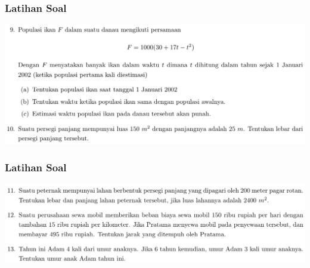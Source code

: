 \documentclass[pdflatex,compress,mathserif]{beamer}
\begin{document}
\begin{frame}
	\frametitle{Latihan Soal}
	\begin{center}
		\includegraphics[width=\linewidth]{img/img36}
	\end{center}
\end{frame}

\begin{frame}
	\frametitle{Latihan Soal}
	\begin{center}
		\includegraphics[width=\linewidth]{img/img37}
	\end{center}
\end{frame}
\end{document}
